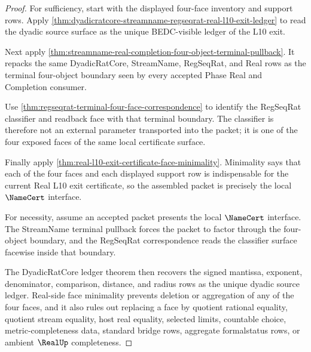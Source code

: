 \begin{proof}
For sufficiency, start with the displayed four-face inventory and support rows. Apply \autoref{thm:dyadicratcore-streamname-regseqrat-real-l10-exit-ledger} to read the dyadic source surface as the unique BEDC-visible ledger of the L10 exit.

Next apply \autoref{thm:streamname-real-completion-four-object-terminal-pullback}. It repacks the same DyadicRatCore, StreamName, RegSeqRat, and Real rows as the terminal four-object boundary seen by every accepted Phase Real and Completion consumer.

Use \autoref{thm:regseqrat-terminal-four-face-correspondence} to identify the RegSeqRat classifier and readback face with that terminal boundary. The classifier is therefore not an external parameter transported into the packet; it is one of the four exposed faces of the same local certificate surface.

Finally apply \autoref{thm:real-l10-exit-certificate-face-minimality}. Minimality says that each of the four faces and each displayed support row is indispensable for the current Real L10 exit certificate, so the assembled packet is precisely the local $\NameCert$ interface.

For necessity, assume an accepted packet presents the local $\NameCert$ interface. The StreamName terminal pullback forces the packet to factor through the four-object boundary, and the RegSeqRat correspondence reads the classifier surface facewise inside that boundary.

The DyadicRatCore ledger theorem then recovers the signed mantissa, exponent, denominator, comparison, distance, and radius rows as the unique dyadic source ledger. Real-side face minimality prevents deletion or aggregation of any of the four faces, and it also rules out replacing a face by quotient rational equality, quotient stream equality, host real equality, selected limits, countable choice, metric-completeness data, standard bridge rows, aggregate formalstatus rows, or ambient $\RealUp$ completeness.
\end{proof}

